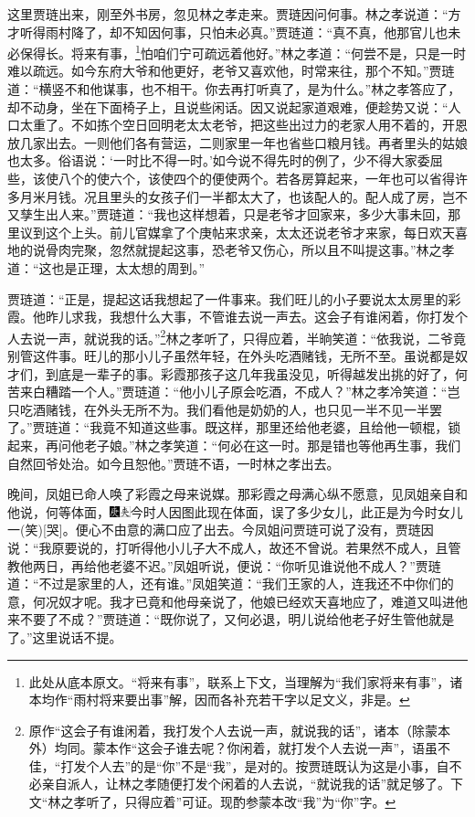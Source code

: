这里贾琏出来，刚至外书房，忽见林之孝走来。贾琏因问何事。林之孝说道：“方才听得雨村降了，却不知因何事，只怕未必真。”贾琏道：“真不真，他那官儿也未必保得长。将来有事，\footnote{此处从底本原文。“将来有事”，联系上下文，当理解为“我们家将来有事”，诸本均作“雨村将来要出事”解，因而各补充若干字以足文义，非是。}怕咱们宁可疏远着他好。”林之孝道：“何尝不是，只是一时难以疏远。如今东府大爷和他更好，老爷又喜欢他，时常来往，那个不知。”贾琏道：“横竖不和他谋事，也不相干。你去再打听真了，是为什么。”林之孝答应了，却不动身，坐在下面椅子上，且说些闲话。因又说起家道艰难，便趁势又说：“人口太重了。不如拣个空日回明老太太老爷，把这些出过力的老家人用不着的，开恩放几家出去。一则他们各有营运，二则家里一年也省些口粮月钱。再者里头的姑娘也太多。俗语说：‘一时比不得一时。’如今说不得先时的例了，少不得大家委屈些，该使八个的使六个，该使四个的便使两个。若各房算起来，一年也可以省得许多月米月钱。况且里头的女孩子们一半都太大了，也该配人的。配人成了房，岂不又孳生出人来。”贾琏道：“我也这样想着，只是老爷才回家来，多少大事未回，那里议到这个上头。前儿官媒拿了个庚帖来求亲，太太还说老爷才来家，每日欢天喜地的说骨肉完聚，忽然就提起这事，恐老爷又伤心，所以且不叫提这事。”林之孝道：“这也是正理，太太想的周到。”

贾琏道：“正是，提起这话我想起了一件事来。我们旺儿的小子要说太太房里的彩霞。他昨儿求我，我想什么大事，不管谁去说一声去。这会子有谁闲着，你打发个人去说一声，就说我的话。”\footnote{原作“这会子有谁闲着，我打发个人去说一声，就说我的话”，诸本（除蒙本外）均同。蒙本作“这会子谁去呢？你闲着，就打发个人去说一声”，语虽不佳，“打发个人去”的是“你”不是“我”，是对的。按贾琏既认为这是小事，自不必亲自派人，让林之孝随便打发个闲着的人去说，“就说我的话”就足够了。下文“林之孝听了，只得应着”可证。现酌参蒙本改“我”为“你”字。}林之孝听了，只得应着，半晌笑道：“依我说，二爷竟别管这件事。旺儿的那小儿子虽然年轻，在外头吃酒赌钱，无所不至。虽说都是奴才们，到底是一辈子的事。彩霞那孩子这几年我虽没见，听得越发出挑的好了，何苦来白糟踏一个人。”贾琏道：“他小儿子原会吃酒，不成人？”林之孝冷笑道：“岂只吃酒赌钱，在外头无所不为。我们看他是奶奶的人，也只见一半不见一半罢了。”贾琏道：“我竟不知道这些事。既这样，那里还给他老婆，且给他一顿棍，锁起来，再问他老子娘。”林之孝笑道：“何必在这一时。那是错也等他再生事，我们自然回爷处治。如今且恕他。”贾琏不语，一时林之孝出去。

晚间，凤姐已命人唤了彩霞之母来说媒。那彩霞之母满心纵不愿意，见凤姐亲自和他说，何等体面，{\includegraphics[width=3mm]{../Images/00004}\includegraphics[width=3mm]{../Images/00012}\footnotesize \kaishu 今时人因图此现在体面，误了多少女儿，此正是为今时女儿一{(笑)}{[}哭{]}。}便心不由意的满口应了出去。今凤姐问贾琏可说了没有，贾琏因说：“我原要说的，打听得他小儿子大不成人，故还不曾说。若果然不成人，且管教他两日，再给他老婆不迟。”凤姐听说，便说：“你听见谁说他不成人？”贾琏道：“不过是家里的人，还有谁。”凤姐笑道：“我们王家的人，连我还不中你们的意，何况奴才呢。我才已竟和他母亲说了，他娘已经欢天喜地应了，难道又叫进他来不要了不成？”贾琏道：“既你说了，又何必退，明儿说给他老子好生管他就是了。”这里说话不提。

